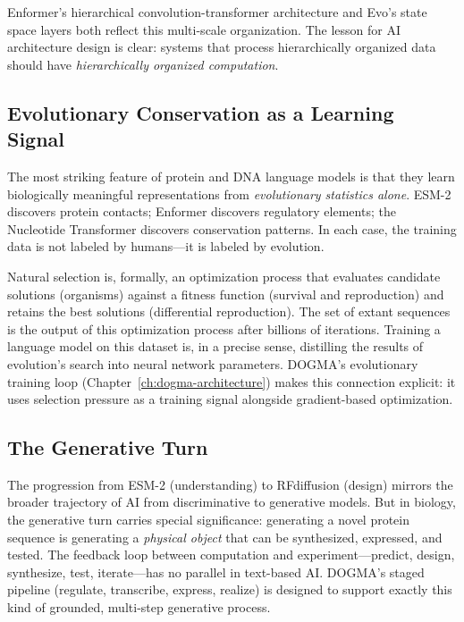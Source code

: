 Enformer's hierarchical convolution-transformer architecture and Evo's state space layers both reflect this multi-scale organization. The lesson for AI architecture design is clear: systems that process hierarchically organized data should have \emph{hierarchically organized computation}.

\subsection{Evolutionary Conservation as a Learning Signal}

The most striking feature of protein and DNA language models is that they learn biologically meaningful representations from \emph{evolutionary statistics alone}. ESM-2 discovers protein contacts; Enformer discovers regulatory elements; the Nucleotide Transformer discovers conservation patterns. In each case, the training data is not labeled by humans---it is labeled by evolution.

\begin{bioinsight}
Natural selection is, formally, an optimization process that evaluates candidate solutions (organisms) against a fitness function (survival and reproduction) and retains the best solutions (differential reproduction). The set of extant sequences is the output of this optimization process after billions of iterations. Training a language model on this dataset is, in a precise sense, distilling the results of evolution's search into neural network parameters. DOGMA's evolutionary training loop (Chapter~\ref{ch:dogma-architecture}) makes this connection explicit: it uses selection pressure as a training signal alongside gradient-based optimization.
\end{bioinsight}

\subsection{The Generative Turn}

The progression from ESM-2 (understanding) to RFdiffusion (design) mirrors the broader trajectory of AI from discriminative to generative models. But in biology, the generative turn carries special significance: generating a novel protein sequence is generating a \emph{physical object} that can be synthesized, expressed, and tested. The feedback loop between computation and experiment---predict, design, synthesize, test, iterate---has no parallel in text-based AI. DOGMA's staged pipeline (regulate, transcribe, express, realize) is designed to support exactly this kind of grounded, multi-step generative process.

